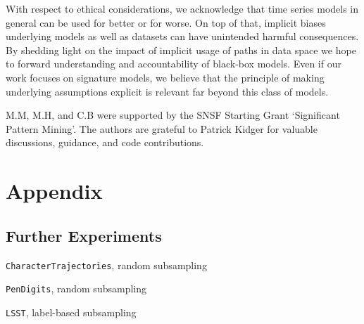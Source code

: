 \documentclass{article}
\begin{document}
With respect to ethical considerations, we acknowledge that time series models in general can be used for better or for worse. On top of that, implicit biases underlying models as well as datasets can have unintended harmful consequences. By shedding light on the impact of implicit usage of paths in data space we hope to forward understanding and accountability of black-box models. Even if our work focuses on signature models, we believe that the principle of making underlying assumptions explicit is relevant far beyond this class of models. 

\begin{ack}
M.M, M.H, and C.B were supported by the SNSF Starting Grant `Significant
Pattern Mining'. The authors are grateful to Patrick Kidger for valuable discussions, guidance, and code contributions.
\end{ack}


\newpage
\appendix

\section{Appendix}\label{sec:Appendix}

\subsection{Further Experiments}\label{supp:Experiments}

\begin{table}[htbp]
    \begin{center}
	\caption{\texttt{CharacterTrajectories}, random subsampling}
	
	\label{supp: tab character}
	\end{center}
\end{table}

\begin{table}[htbp]
    \begin{center}
	\caption{\texttt{PenDigits}, random subsampling}
	
	\label{supp: tab pendigits}
	\end{center}
\end{table}

\begin{table}[htbp]
    \begin{center}
	\caption{\texttt{LSST}, label-based subsampling}
	
	\label{supp: tab lsst label-based}
	\end{center}
\end{table}
\end{document}

